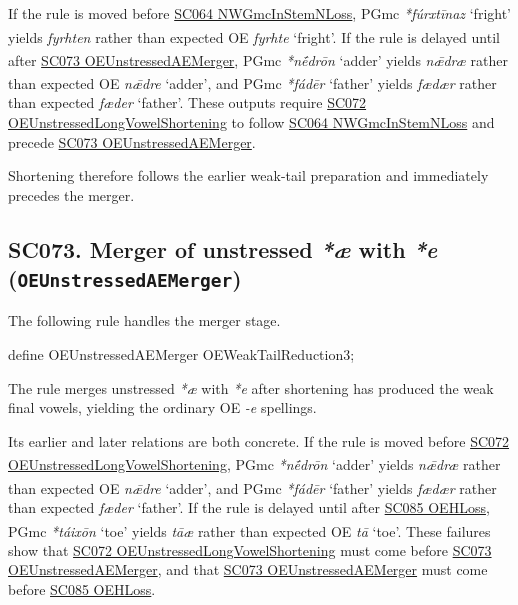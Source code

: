 \documentclass[
  british,
  a4paper,
  openany]{book}
\providecommand{\Pred}[1]{\textsuperscript{\dag}\emph{#1}}
\providecommand{\Recon}[1]{\emph{*#1}}
{\catcode`→=\active \global\def→{\ensuremath{\rightarrow}}}
\providecommand{\texorpdfstring}[2]{#1}
\providecommand{\Pred}[1]{\textsuperscript{\dag}\emph{#1}}
\providecommand{\Recon}[1]{\emph{*#1}}
{\catcode`→=\active \global\def→{\ensuremath{\rightarrow}}}
\begin{document}
If the rule is moved before \hyperref[rule-NWGmcInStemNLoss]{SC064
NWGmcInStemNLoss}, PGmc \Recon{fúrxtīnaz} `fright' yields \Pred{fyrhten}
rather than expected OE \emph{fyrhte} `fright'. If the rule is delayed
until after \hyperref[rule-OEUnstressedAEMerger]{SC073
OEUnstressedAEMerger}, PGmc \Recon{nḗdrōn} `adder' yields \Pred{nǣdræ}
rather than expected OE \emph{nǣdre} `adder', and PGmc \Recon{fádēr}
`father' yields \Pred{fædær} rather than expected \emph{fæder} `father'.
These outputs require
\hyperref[rule-OEUnstressedLongVowelShortening]{SC072
OEUnstressedLongVowelShortening} to follow
\hyperref[rule-NWGmcInStemNLoss]{SC064 NWGmcInStemNLoss} and precede
\hyperref[rule-OEUnstressedAEMerger]{SC073 OEUnstressedAEMerger}.

Shortening therefore follows the earlier weak-tail preparation and
immediately precedes the merger.

\subsection{\texorpdfstring{SC073. Merger of unstressed \emph{*æ} with
\emph{*e}
(\texttt{OEUnstressedAEMerger})}{SC073. Merger of unstressed  with  (OEUnstressedAEMerger)}}\label{rule-OEUnstressedAEMerger}

The following rule handles the merger stage.

\begin{ReaderFacingFoma}
define OEUnstressedAEMerger OEWeakTailReduction3;
\end{ReaderFacingFoma}

The rule merges unstressed \emph{*æ} with \emph{*e} after shortening has
produced the weak final vowels, yielding the ordinary OE \emph{-e}
spellings.

Its earlier and later relations are both concrete. If the rule is moved
before \hyperref[rule-OEUnstressedLongVowelShortening]{SC072
OEUnstressedLongVowelShortening}, PGmc \Recon{nḗdrōn} `adder' yields
\Pred{nǣdræ} rather than expected OE \emph{nǣdre} `adder', and PGmc
\Recon{fádēr} `father' yields \Pred{fædær} rather than expected
\emph{fæder} `father'. If the rule is delayed until after
\hyperref[rule-OEHLoss]{SC085 OEHLoss}, PGmc \Recon{táixōn} `toe' yields
\Pred{tāæ} rather than expected OE \emph{tā} `toe'. These failures show
that \hyperref[rule-OEUnstressedLongVowelShortening]{SC072
OEUnstressedLongVowelShortening} must come before
\hyperref[rule-OEUnstressedAEMerger]{SC073 OEUnstressedAEMerger}, and
that \hyperref[rule-OEUnstressedAEMerger]{SC073 OEUnstressedAEMerger}
must come before \hyperref[rule-OEHLoss]{SC085 OEHLoss}.
\end{document}
